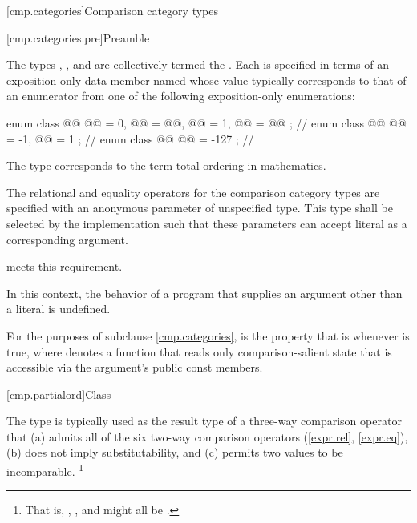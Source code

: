 [cmp.categories]{Comparison category types}

[cmp.categories.pre]{Preamble}

\pnum
The types
,
, and
are collectively termed the .
Each is specified in terms of an exposition-only data member named 
whose value typically corresponds to that of an enumerator
from one of the following exposition-only enumerations:

\begin{codeblock}
enum class @@ { @@ = 0, @@ = @@,
                @@ = 1, @@ = @@ };   // \expos
enum class @@ { @@ = -1, @@ = 1 };                  // \expos
enum class @@ { @@ = -127 };                       // \expos
\end{codeblock}

\pnum
\begin{note}
The type 
corresponds to the term
total ordering in mathematics.
\end{note}

\pnum
The relational and equality operators for the comparison category types
are specified with an anonymous parameter of unspecified type.
This type shall be selected by the implementation such that
these parameters can accept literal  as a corresponding argument.
\begin{example}
meets this requirement.
\end{example}
In this context, the behavior of a program that supplies
an argument other than a literal  is undefined.

\pnum
For the purposes of subclause \ref{cmp.categories},
 is the property that  is 
whenever  is true,
where  denotes a function that reads only comparison-salient state
that is accessible via the argument's public const members.

[cmp.partialord]{Class }

\pnum
The  type is typically used
as the result type of a three-way comparison operator
that (a) admits all of the six two-way comparison operators (\ref{expr.rel}, \ref{expr.eq}),
(b) does not imply substitutability,
and (c) permits two values to be incomparable.%
\footnote{That is, , , and  might all be .}

